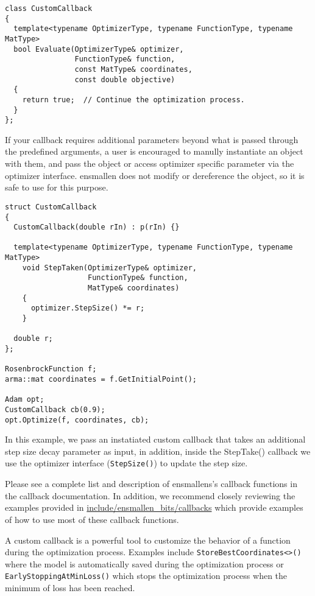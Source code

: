 \begin{verbatim}
class CustomCallback
{
  template<typename OptimizerType, typename FunctionType, typename MatType>
  bool Evaluate(OptimizerType& optimizer,
                FunctionType& function,
                const MatType& coordinates,
                const double objective)
  {
    return true;  // Continue the optimization process.
  }
};
\end{verbatim}

If your callback requires additional parameters beyond what is passed through
the predefined arguments, a user is encouraged to manully instantiate an object
with them, and pass the object or access optimizer specific parameter via the
optimizer interface. ensmallen does not modify or dereference the object, so it
is safe to use for this purpose.

\begin{verbatim}
struct CustomCallback
{
  CustomCallback(double rIn) : p(rIn) {}

  template<typename OptimizerType, typename FunctionType, typename MatType>
    void StepTaken(OptimizerType& optimizer,
                   FunctionType& function,
                   MatType& coordinates)
    {
      optimizer.StepSize() *= r;
    }

  double r;
};

RosenbrockFunction f;
arma::mat coordinates = f.GetInitialPoint();

Adam opt;
CustomCallback cb(0.9);
opt.Optimize(f, coordinates, cb);
\end{verbatim}

In this example, we pass an instatiated custom callback that takes an additional
step size decay parameter as input, in addition, inside the StepTake() callback
we use the optimizer interface ({\tt StepSize()}) to update the step size.

Please see a complete list and description of ensmallens's callback functions in
the callback documentation. In addition, we recommend closely reviewing the
examples provided in
\url{include/ensmallen_bits/callbacks}
which provide examples of how to use most of these callback functions.









A custom callback is a powerful tool to customize the behavior of a function
during the optimization process. Examples include {\tt StoreBestCoordinates<>()}
where the model is automatically saved during the optimization process or {\tt
EarlyStoppingAtMinLoss()}  which stops the optimization process when the minimum
of loss has been reached.

